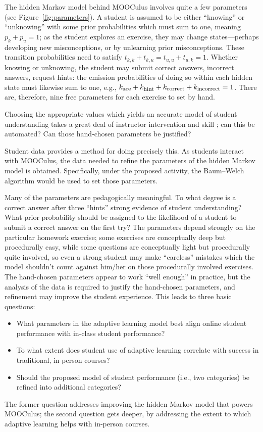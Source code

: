 \documentclass[12pt]{article}
\begin{document}
The hidden Markov model behind MOOCulus involves quite a few
parameters (see Figure~\ref{fig:parameters}).  A student is assumed to
be either ``knowing'' or ``unknowing'' with some prior probabilities
which must sum to one, meaning $p_k + p_u = 1$; as the student
explores an exercise, they may change states---perhaps developing new
misconceptions, or by unlearning prior misconceptions.  These
transition probabilities need to satisfy $t_{k,k} + t_{k,u} = t_{u,u}
+ t_{u,k} = 1$.  Whether knowing or unknowing, the student may submit
correct answers, incorrect answers, request hints: the emission
probabilities of doing so within each hidden state must likewise sum
to one, e.g., $k_{\mbox{\footnotesize ace}} + k_{\mbox{\footnotesize
    hint}} + k_{\mbox{\footnotesize correct}} + k_{\mbox{\footnotesize
    incorrect}}=1$.  There are, therefore, nine free parameters for
each exercise to set by hand.

Choosing the appropriate values which yields an accurate model of
student understanding takes a great deal of instructor intervention
and skill \parencite{romero2010educational}; can this be automated?
Can those hand-chosen parameters be justified?

Student data provides a method for doing precisely this.  As students
interact with MOOCulus, the data needed to refine the parameters of
the hidden Markov model is obtained.  Specifically, under the proposed
activity, the Baum--Welch algorithm would be used to set those
parameters.

Many of the parameters are pedagogically meaningful.  To what degree
is a correct answer after three ``hints'' strong evidence of student
understanding?  What prior probability should be assigned to the
likelihood of a student to submit a correct answer on the first try?
The parameters depend strongly on the particular homework exercise;
some exercises are conceptually deep but procedurally easy, while some
questions are conceptually light but procedurally quite involved, so
even a strong student may make ``careless'' mistakes which the model
shouldn't count against him/her on those procedurally involved
exercises.  The hand-chosen parameters appear to work ``well enough''
in practice, but the analysis of the data is required to justify the
hand-chosen parameters, and refinement may improve the student
experience. This leads to three basic questions:
\begin{itemize}
\item What parameters in the adaptive learning model best align online
  student performance with in-class student performance?
\item To what extent does student use of adaptive learning correlate
  with success in traditional, in-person courses?
\item Should the proposed model of student performance (i.e., two
  categories) be refined into additional categories?  
\end{itemize}
The former question addresses improving the hidden Markov model that
powers MOOCulus; the second question gets deeper, by addressing the
extent to which adaptive learning helps with in-person courses.
\end{document}
